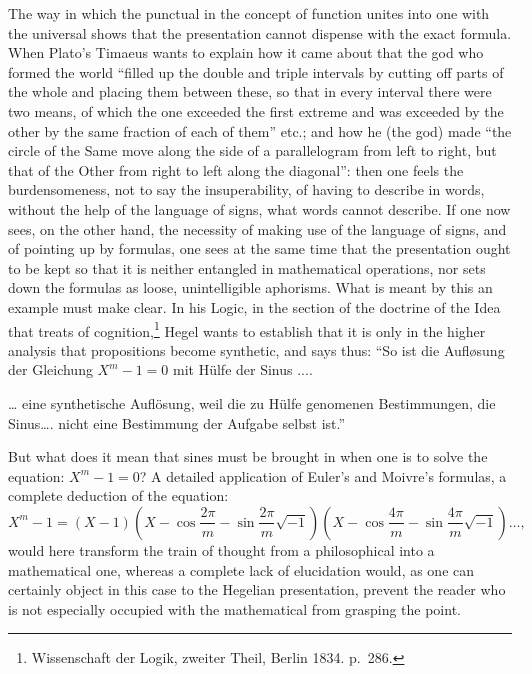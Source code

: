 \documentclass[12pt,a4paper,openany]{book}
\newcommand{\opage}[1]{\marginnote{\footnotesize\textit{[#1]}}}
\begin{document}
The way in which the punctual in the concept of function
unites into one with the universal shows
that the presentation cannot dispense with the exact formula.
When Plato's Timaeus wants to explain how it came about that
the god who formed the world ``filled up the double and triple
intervals by cutting off parts of the whole and
placing them between these, so that in every interval
there were two means, of which the one exceeded the first extreme
and was exceeded by the other by the same fraction of
each of them'' etc.; and how he (the god) made
``the circle of the Same move along the side of a parallelogram
from left to right, but that of the Other from right to
left along the diagonal'': then one feels the burdensomeness, %
not to say the insuperability, of having to describe in words, without the help of
the language of signs, what words cannot describe.
\setcounter{footnote}{0}%
\opage{27}If one now sees, on the other hand, the necessity of making
use of the language of signs, and of pointing up by formulas, one sees
at the same time that the presentation ought to be kept so that it is neither
entangled in mathematical operations, nor sets down the formulas
as loose, unintelligible aphorisms. What is meant by this
an example must make clear. In his Logic, in the section
of the doctrine of the Idea that treats of cognition,\footnote[1]{Wissenschaft der Logik, zweiter Theil, Berlin 1834. p.\ 286.} Hegel wants to establish
that it is only in the higher analysis that propositions
become synthetic, and says thus: ``So ist die Aufløsung %
der Gleichung $X^{m}-1=0$ mit Hülfe der Sinus ....

\dots{} eine synthetische Auflösung, weil die zu Hülfe genomenen
Bestimmungen, die Sinus\dots{}. nicht eine Bestimmung
der Aufgabe selbst ist.''

But what does it mean that sines must be brought in
when one is to solve the equation: $X^{m}-1=0$? A detailed
application of Euler's and Moivre's formulas, a complete
deduction of the equation:
\[ X^{m}-1=(X-1)(X-\cos\frac{2\pi}{m}-\sin\frac{2\pi}{m}\sqrt{-1})(X-\cos\frac{4\pi}{m}-\sin\frac{4\pi}{m}\sqrt{-1})\ldots, \]
would here transform the train of thought from a philosophical into a
mathematical one, whereas a complete lack of elucidation
would, as one can certainly object in this case to
the Hegelian presentation, prevent the reader who is not especially
occupied with the mathematical from grasping the point.
\end{document}

